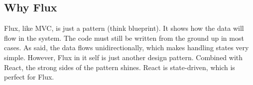 \subsection{Why Flux}
Flux, like MVC, is just a pattern (think blueprint). It shows how the data will flow in the system. The code must still be written from the ground up in most cases. As said, the data flows unidirectionally, which makes handling states very simple. However, Flux in it self is just another design pattern. Combined with React, the strong sides of the pattern shines. React is state-driven, which is perfect for Flux.
